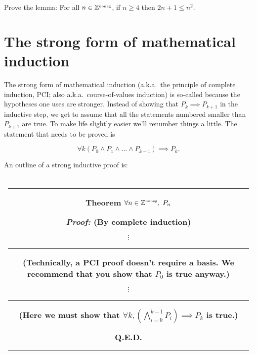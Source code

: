 \begin{exer} 
Prove the lemma:  For all $n \in {\mathbb Z}^{\mbox{\tiny noneg}}$, if $n \geq 4$ then
$2n+1 \leq n^2$.
\end{exer}

\newpage
  



\newpage
 
\section{The strong form of mathematical induction}
\label{sec:strong_induct}

The strong form of mathematical induction (a.k.a.\ the principle of
complete induction, PCI; also a.k.a.\ course-of-values induction) 
is so-called because the hypotheses one
uses are stronger.  Instead of showing that $P_k \implies P_{k+1}$ in
the inductive step, we get to assume that all the statements numbered
smaller than $P_{k+1}$ are true.  To make life slightly easier we'll
renumber things a little.  The statement that needs to be proved is

\[ \forall k (P_0 \land P_1 \land \ldots \land  P_{k-1}) \implies P_k. \]

 An outline of a strong inductive proof is:

\begin{center}
\begin{tabular}{|c|} \hline
\rule{16pt}{0pt}\begin{minipage}{.75\textwidth}

\rule{0pt}{16pt}{\bf \large Theorem} $ \displaystyle \forall n \in {\mathbb Z}^{\mbox{\tiny noneg}}, \; P_n $
\medskip

\rule{0pt}{20pt} {\em Proof:} (By complete induction)

\noindent {\bf Basis:}

\begin{center}
$\vdots$ \rule{36pt}{0pt} \begin{minipage}[c]{1.7 in} (Technically, a PCI %
proof doesn't require a basis.   We recommend that you show that $P_0$ %
is true anyway.) \end{minipage}
\end{center}

\noindent {\bf Inductive step:}

\begin{center}
$\vdots$ \rule{36pt}{0pt} \begin{minipage}[c]{1.7 in} (Here we must show that $\forall k,  \left( \bigwedge_{i=0}^{k-1} P_i \right) \implies P_{k}$ is true.) \end{minipage}
\end{center}

\rule{0pt}{0pt} \hspace{\fill} Q.E.D. \rule[-10pt]{0pt}{16pt}
\end{minipage} \rule{16pt}{0pt} \\ \hline
\end{tabular}
\end{center}
\medskip

